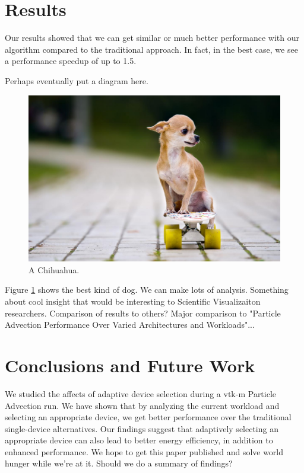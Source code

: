 \documentclass{IEEEtran}
\begin{document}
\section{Results}
Our results showed that we can get similar or much better performance with our algorithm compared to the traditional approach. In fact, in the best case, we see a performance speedup of up to 1.5.
\begin{center}
 Perhaps eventually put a diagram here.
\end{center}
%
\begin{figure}
  \includegraphics[width=\linewidth]{chichi.jpg}
  \caption{A Chihuahua.}
  \label{fig:chichi}
\end{figure}
%
Figure \ref{fig:chichi} shows the best kind of dog.
%
We can make lots of analysis.
%
Something about cool insight that would be interesting to Scientific Visualizaiton researchers.
%
Comparison of results to others? 
%
Major comparison to "Particle Advection Performance Over Varied Architectures and Workloads"...
%
\section{Conclusions and Future Work}
We studied the affects of adaptive device selection during a vtk-m Particle Advection run. 
%
We have shown that by analyzing the current workload and selecting an appropriate device, we get better performance over the traditional single-device alternatives. 
%
Our findings suggest that adaptively selecting an appropriate device can also lead to better energy efficiency, in addition to enhanced performance. 
%
We hope to get this paper published and solve world hunger while we're at it.
%
Should we do a summary of findings?
\end{document}
